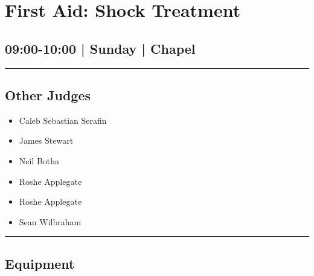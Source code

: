 \documentclass[10pt, A5]{article}
\begin{document}
        \begin{framed}
        \begin{minipage}{\textwidth}

        \setcounter{section}{63}
        \section{First Aid: Shock Treatment}
        \subsection*{09:00-10:00 | Sunday | Chapel}

        \vspace{0.25cm}
        \hrule
        \vspace{0.25cm}


        \subsection*{Other Judges}
                    

        	\begin{multicols}{2}

		\begin{itemize}
									\item Caleb Sebastian Serafin
									\item James Stewart
									\item Neil Botha
									\item Roshe Applegate
						\end{itemize}

		\vfill\null
		\columnbreak

		\begin{itemize}
									\item Roshe Applegate
									\item Sean Wilbraham
						\end{itemize}

		\vfill\null

		\end{multicols}

    \vspace{0.25cm}
        \hrule
        \vspace{0.25cm}

        \begin{multicols}{2}

		\section*{\faWrench \: Equipment}


\end{multicols}
\end{minipage}
\end{framed}
\end{document}
